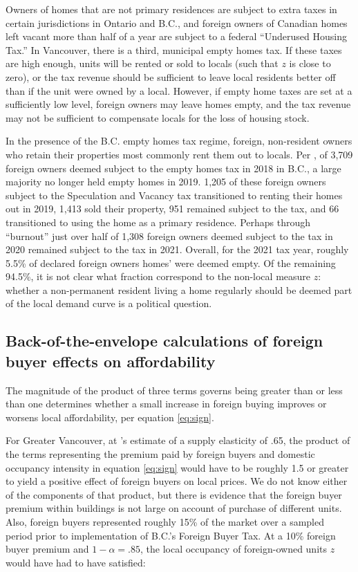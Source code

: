 \documentclass[12pt]{article}
\begin{document}
Owners of homes that are not primary residences are subject to extra taxes in
certain jurisdictions in Ontario and B.C., and foreign owners of Canadian homes
left vacant more than half of a year are subject to a federal ``Underused
Housing Tax.'' In Vancouver, there is a third, municipal empty homes tax. If
these taxes are high enough, units will be rented or sold to locals (such that
$z$ is close to zero), or the tax revenue should be sufficient to leave local
residents better off than if the unit were owned by a local. However, if empty
home taxes are set at a sufficiently low level, foreign owners may leave homes
empty, and the tax revenue may not be sufficient to compensate locals for the
loss of housing stock.

In the presence of the B.C. empty homes tax regime, foreign, non-resident
owners who retain their properties most commonly rent them out to locals. Per
\textcite{specTax2019}, of 3,709 foreign owners deemed subject to the empty
homes tax in 2018 in B.C., a large majority no longer held empty homes in 2019.
1,205 of these foreign owners subject to the Speculation and Vacancy tax
transitioned to renting their homes out in 2019, 1,413 sold their property, 951
remained subject to the tax, and 66 transitioned to using the home as a primary
residence. Perhaps through ``burnout'' just over half of 1,308 foreign owners
deemed subject to the tax in 2020 remained subject to the tax in 2021. Overall,
for the 2021 tax year, roughly 5.5\% of declared foreign owners homes' were
deemed empty. Of the remaining 94.5\%, it is not clear what fraction correspond
to the non-local measure $z$: whether a non-permanent resident living a home
regularly should be deemed part of the local demand curve is a political
question.

\subsection{Back-of-the-envelope calculations of foreign buyer effects on affordability}

The magnitude of the product of three terms governs being greater than or less than one determines whether a small increase in foreign buying improves or worsens local affordability, per equation \eqref{eq:sign}. 

For Greater Vancouver, at \textcite{paixao2021housing}'s estimate of a supply
elasticity of .65, the product of the terms representing the premium paid by
foreign buyers and domestic occupancy intensity in equation \eqref{eq:sign}
would have to be roughly 1.5 or greater to yield a positive effect of foreign
buyers on local prices. We do not know either of the components of that
product, but there is evidence that the foreign buyer premium within buildings
is not large on account of purchase of different units. Also, foreign buyers
represented roughly 15\% of the market over a sampled period prior to
implementation of B.C.'s Foreign Buyer Tax. At a 10\% foreign buyer premium and
$1-\alpha=.85$, the local occupancy of foreign-owned units $z$ would have had
to have satisfied:
\end{document}
